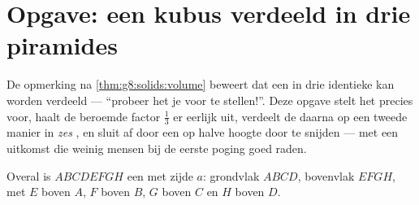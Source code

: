 \section{Opgave: een kubus verdeeld in drie piramides}

\begin{problem}
\label{pb:g8:solids:1}
De opmerking na \cref{thm:g8:solids:volume} beweert dat een  in drie
identieke  kan worden verdeeld --- ``probeer het je voor te stellen!''.
Deze opgave stelt het precies voor, haalt de beroemde factor $\frac13$ er
eerlijk uit, verdeelt de  daarna op een tweede manier in \emph{zes}
, en sluit af door een  op halve hoogte door te snijden --- met
een uitkomst die weinig mensen bij de eerste poging goed raden.

Overal is $ABCDEFGH$ een  met zijde $a$: grondvlak $ABCD$, bovenvlak
$EFGH$, met $E$ boven $A$, $F$ boven $B$, $G$ boven $C$ en $H$ boven $D$.


\end{problem}
